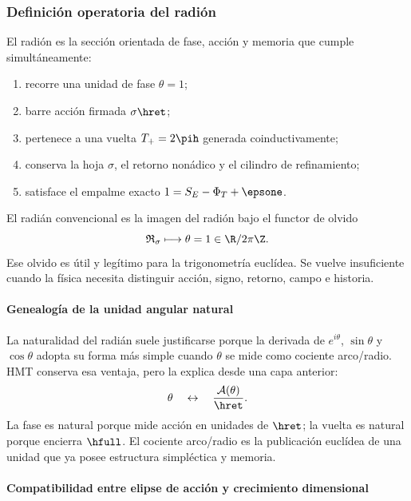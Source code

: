 \subsubsection{Definición operatoria del radión}

\begin{definition}
El radión es la sección orientada de fase, acción y memoria que cumple
simultáneamente:
\begin{enumerate}
\item recorre una unidad de fase \(\theta=1\);
\item barre acción firmada \(\sigma\hret\);
\item pertenece a una vuelta \(T_+=2\pih\) generada coinductivamente;
\item conserva la hoja \(\sigma\), el retorno nonádico y el cilindro de
refinamiento;
\item satisface el empalme exacto
\(1=S_E-\Phi_T+\epsone\).
\end{enumerate}
\end{definition}

El radián convencional es la imagen del radión bajo el functor de olvido
\[
\mathfrak R_\sigma
\longmapsto
\theta=1\in\R/2\pi\Z.
\]
Ese olvido es útil y legítimo para la trigonometría euclídea. Se vuelve
insuficiente cuando la física necesita distinguir acción, signo, retorno,
campo e historia.

\paragraph{Genealogía de la unidad angular natural}

La naturalidad del radián suele justificarse porque la derivada de
\(e^{i\theta}\), \(\sin\theta\) y \(\cos\theta\) adopta su forma más simple
cuando \(\theta\) se mide como cociente arco/radio. HMT conserva esa ventaja,
pero la explica desde una capa anterior:
\[
\theta\quad\leftrightarrow\quad
\frac{\mathcal A(\theta)}{\hret}.
\]
La fase es natural porque mide acción en unidades de \(\hret\); la vuelta es
natural porque encierra \(\hfull\). El cociente arco/radio es la publicación
euclídea de una unidad que ya posee estructura simpléctica y memoria.

\paragraph{Compatibilidad entre elipse de acción y crecimiento dimensional}

